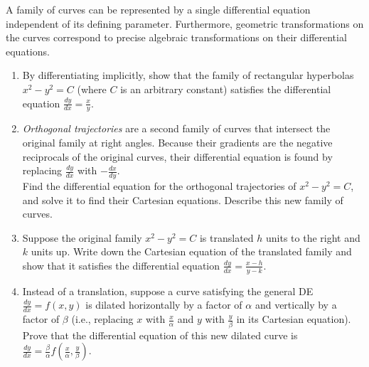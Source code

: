 
\begin{problem}
A family of curves can be represented by a single differential equation independent of its defining parameter. Furthermore, geometric transformations on the curves correspond to precise algebraic transformations on their differential equations.

\begin{enumerate}
    \item[\textbf{i}] By differentiating implicitly, show that the family of rectangular hyperbolas $x^2 - y^2 = C$ (where $C$ is an arbitrary constant) satisfies the differential equation $\frac{dy}{dx} = \frac{x}{y}$.
    \item[\textbf{ii}] \textit{Orthogonal trajectories} are a second family of curves that intersect the original family at right angles. Because their gradients are the negative reciprocals of the original curves, their differential equation is found by replacing $\frac{dy}{dx}$ with $-\frac{dx}{dy}$. \\
    Find the differential equation for the orthogonal trajectories of $x^2 - y^2 = C$, and solve it to find their Cartesian equations. Describe this new family of curves.
    \item[\textbf{iii}] Suppose the original family $x^2 - y^2 = C$ is translated $h$ units to the right and $k$ units up. Write down the Cartesian equation of the translated family and show that it satisfies the differential equation $\frac{dy}{dx} = \frac{x-h}{y-k}$.
    \item[\textbf{iv}] Instead of a translation, suppose a curve satisfying the general DE $\frac{dy}{dx} = f(x, y)$ is dilated horizontally by a factor of $\alpha$ and vertically by a factor of $\beta$ (i.e., replacing $x$ with $\frac{x}{\alpha}$ and $y$ with $\frac{y}{\beta}$ in its Cartesian equation). Prove that the differential equation of this new dilated curve is $\frac{dy}{dx} = \frac{\beta}{\alpha} f\left(\frac{x}{\alpha}, \frac{y}{\beta}\right)$.
\end{enumerate}
\end{problem}

